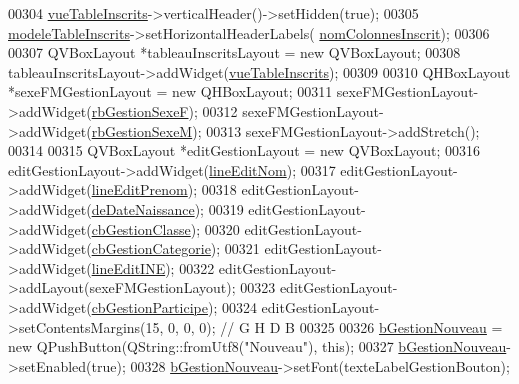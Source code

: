 \begin{DoxyCode}
00304     \hyperlink{class_i_h_m_gestion_cross_a79b4e49cf8b22c9894d366e08b722c55}{vueTableInscrits}->verticalHeader()->setHidden(\textcolor{keyword}{true});
00305     \hyperlink{class_i_h_m_gestion_cross_a19565551280115e642ceb9790c7317bc}{modeleTableInscrits}->setHorizontalHeaderLabels(
      \hyperlink{class_i_h_m_gestion_cross_a94c58ce12155f117e0515ce0fc6503bc}{nomColonnesInscrit});
00306 
00307     QVBoxLayout *tableauInscritsLayout = \textcolor{keyword}{new} QVBoxLayout;
00308     tableauInscritsLayout->addWidget(\hyperlink{class_i_h_m_gestion_cross_a79b4e49cf8b22c9894d366e08b722c55}{vueTableInscrits});
00309 
00310     QHBoxLayout *sexeFMGestionLayout = \textcolor{keyword}{new} QHBoxLayout;
00311     sexeFMGestionLayout->addWidget(\hyperlink{class_i_h_m_gestion_cross_a4474ef47310eb3511befdf1beaa18b56}{rbGestionSexeF});
00312     sexeFMGestionLayout->addWidget(\hyperlink{class_i_h_m_gestion_cross_a7d471a7f96862dcd302f7f8cc52dfea4}{rbGestionSexeM});
00313     sexeFMGestionLayout->addStretch();
00314 
00315     QVBoxLayout *editGestionLayout = \textcolor{keyword}{new} QVBoxLayout;
00316     editGestionLayout->addWidget(\hyperlink{class_i_h_m_gestion_cross_a633102626c5dedd575b51a1ba5c6e708}{lineEditNom});
00317     editGestionLayout->addWidget(\hyperlink{class_i_h_m_gestion_cross_a7bea7529f01cf8ca8f365d418aae52d5}{lineEditPrenom});
00318     editGestionLayout->addWidget(\hyperlink{class_i_h_m_gestion_cross_a1c63c5c91be88aef13d2582e48dff7d0}{deDateNaissance});
00319     editGestionLayout->addWidget(\hyperlink{class_i_h_m_gestion_cross_af734c4b13942dd83fbbd0355e3728c9f}{cbGestionClasse});
00320     editGestionLayout->addWidget(\hyperlink{class_i_h_m_gestion_cross_a60cdc44c61bcd4e1e189c8de5556b89e}{cbGestionCategorie});
00321     editGestionLayout->addWidget(\hyperlink{class_i_h_m_gestion_cross_ab6c32fd079f81c4fa0b9ec0b4ef9bb61}{lineEditINE});
00322     editGestionLayout->addLayout(sexeFMGestionLayout);
00323     editGestionLayout->addWidget(\hyperlink{class_i_h_m_gestion_cross_a89aff3b1c5d5198dd7aaecd932331e0d}{cbGestionParticipe});
00324     editGestionLayout->setContentsMargins(15, 0, 0, 0); \textcolor{comment}{// G H D B}
00325 
00326     \hyperlink{class_i_h_m_gestion_cross_ab987235a79961d3d186878052a02b21b}{bGestionNouveau} = \textcolor{keyword}{new} QPushButton(QString::fromUtf8(\textcolor{stringliteral}{"Nouveau"}), \textcolor{keyword}{this});
00327     \hyperlink{class_i_h_m_gestion_cross_ab987235a79961d3d186878052a02b21b}{bGestionNouveau}->setEnabled(\textcolor{keyword}{true});
00328     \hyperlink{class_i_h_m_gestion_cross_ab987235a79961d3d186878052a02b21b}{bGestionNouveau}->setFont(texteLabelGestionBouton);

\end{DoxyCode}
